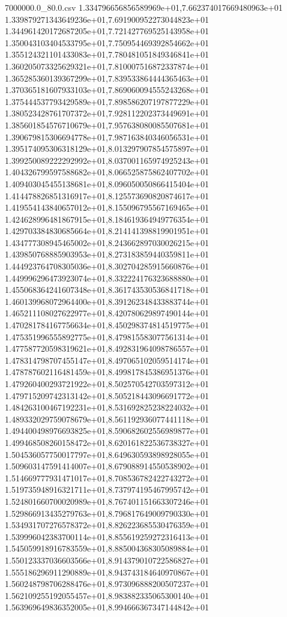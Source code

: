 \begin{filecontents*}{7000000.0_80.0.csv}
1.334796656856589969e+01,7.662374017669480963e+01
1.339879271343649236e+01,7.691900952273044823e+01
1.344961420172687205e+01,7.721427769525143958e+01
1.350043103404533795e+01,7.750954469392854662e+01
1.355124321101433083e+01,7.780481051849346841e+01
1.360205073325629321e+01,7.810007516872337874e+01
1.365285360139367299e+01,7.839533864444365463e+01
1.370365181607933103e+01,7.869060094555243268e+01
1.375444537793429589e+01,7.898586207197877229e+01
1.380523428761707372e+01,7.928112202373449691e+01
1.385601854576710679e+01,7.957638080085507681e+01
1.390679815306694778e+01,7.987163840346056531e+01
1.395174095306318129e+01,8.013297907854575897e+01
1.399250089222292992e+01,8.037001165974925243e+01
1.404326799597588682e+01,8.066525875862407702e+01
1.409403045455138681e+01,8.096050050866415404e+01
1.414478826851316917e+01,8.125573690820874617e+01
1.419554143840657012e+01,8.155096795567169465e+01
1.424628996481867915e+01,8.184619364949776354e+01
1.429703384830685664e+01,8.214141398819901951e+01
1.434777308945465002e+01,8.243662897030026215e+01
1.439850768885903953e+01,8.273183859440359811e+01
1.444923764708305036e+01,8.302704285915660876e+01
1.449996296473923074e+01,8.332224176323688880e+01
1.455068364241607348e+01,8.361743530536841718e+01
1.460139968072964400e+01,8.391262348433883744e+01
1.465211108027622977e+01,8.420780629897490144e+01
1.470281784167756634e+01,8.450298374814519775e+01
1.475351996555892775e+01,8.479815583077561314e+01
1.477587720598319621e+01,8.492831964098786557e+01
1.478314798707455147e+01,8.497065102059514174e+01
1.478787602116481459e+01,8.499817845386951376e+01
1.479260400293721922e+01,8.502570542703597312e+01
1.479715209742313142e+01,8.505218443096691772e+01
1.484263100467192231e+01,8.531692825238224032e+01
1.489332029759078679e+01,8.561192936077441118e+01
1.494400498976693825e+01,8.590682602556989877e+01
1.499468508260158472e+01,8.620161822536738327e+01
1.504536057750017797e+01,8.649630593898928055e+01
1.509603147591414007e+01,8.679088914550538902e+01
1.514669777931471017e+01,8.708536782422743272e+01
1.519735948916321711e+01,8.737974195467995742e+01
1.524801660700020989e+01,8.767401151663307246e+01
1.529866913435279763e+01,8.796817649009790330e+01
1.534931707276578372e+01,8.826223685530476359e+01
1.539996042383700114e+01,8.855619259272316413e+01
1.545059918916783559e+01,8.885004368305089884e+01
1.550123337036603566e+01,8.914379010722586827e+01
1.555186296911290889e+01,8.943743184640970867e+01
1.560248798706288476e+01,8.973096888200507237e+01
1.562109255192055457e+01,8.983882335065300140e+01
1.563969649836352005e+01,8.994666367347144842e+01

\end{filecontents*}
